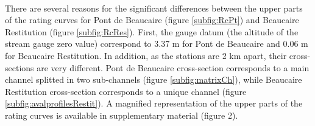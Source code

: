     \paragraph{}
There are several reasons for the significant differences between the upper parts of the rating curves for Pont de Beaucaire (figure \ref{subfig:RcPt}) and Beaucaire Restitution (figure \ref{subfig:RcRes}). First, the gauge datum (the altitude of the stream gauge zero value) correspond to 3.37 m for Pont de Beaucaire and 0.06 m for Beaucaire Restitution. In addition, as the stations are 2 km apart, their cross-sections are very different. Pont de Beaucaire cross-section corresponds to a main channel splitted in two sub-channels (figure \ref{subfig:matrixCh}), while Beaucaire Restitution cross-section corresponds to a unique channel (figure \ref{subfig:avalprofilesRestit}). A magnified representation of the upper parts of the rating curves is available in supplementary material (figure 2).
	
